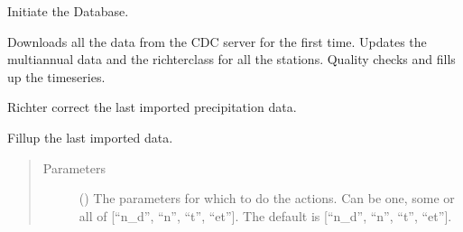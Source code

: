 \documentclass[letterpaper,10pt,english]{sphinxmanual}
\begin{document}
\begin{fulllineitems}
\begin{fulllineitems}
\label{\detokenize{weatherDB:weatherDB.broker.Broker.initiate_db}}
\sphinxAtStartPar
Initiate the Database.

\sphinxAtStartPar
Downloads all the data from the CDC server for the first time.
Updates the multi\sphinxhyphen{}annual data and the richter\sphinxhyphen{}class for all the stations.
Quality checks and fills up the timeseries.

\end{fulllineitems}


\begin{fulllineitems}
\label{\detokenize{weatherDB:weatherDB.broker.Broker.last_imp_corr}}
\sphinxAtStartPar
Richter correct the last imported precipitation data.

\end{fulllineitems}


\begin{fulllineitems}
\label{\detokenize{weatherDB:weatherDB.broker.Broker.last_imp_fillup}}
\sphinxAtStartPar
Fillup the last imported data.
\begin{quote}\begin{description}
\item[{Parameters}] \leavevmode
\sphinxAtStartPar
{} (\sphinxstyleliteralemphasis{\sphinxupquote{, }}) \textendash{} The parameters for which to do the actions.
Can be one, some or all of {[}“n\_d”, “n”, “t”, “et”{]}.
The default is {[}“n\_d”, “n”, “t”, “et”{]}.

\end{description}\end{quote}


\end{fulllineitems}
\end{fulllineitems}
\end{document}

